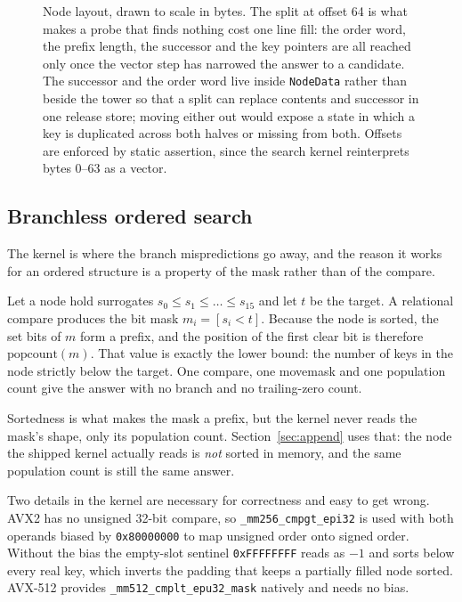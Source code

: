 \documentclass[conference]{IEEEtran}
\begin{document}
\begin{figure}[t]
{\begin{tikzpicture}
\end{tikzpicture}}
\caption{Node layout, drawn to scale in bytes. The split at offset 64 is what makes a
probe that finds nothing cost one line fill: the order word, the prefix length, the
successor and the key pointers are all reached only once the vector step has narrowed
the answer to a candidate. The successor and the order word live inside
\texttt{NodeData} rather than beside the tower so that a split can replace contents and
successor in one release store; moving either out would expose a state in which a key is
duplicated across both halves or missing from both. Offsets are enforced by static
assertion, since the search kernel reinterprets bytes 0--63 as a vector.}
\label{fig:layout}
\end{figure}

\subsection{Branchless ordered search}
\label{sec:kernel}

The kernel is where the branch mispredictions go away, and the reason it works for
an ordered structure is a property of the mask rather than of the compare.

Let a node hold surrogates $s_0 \le s_1 \le \dots \le s_{15}$ and let $t$ be the
target. A relational compare produces the bit mask $m_i = [s_i < t]$. Because the
node is sorted, the set bits of $m$ form a prefix, and the position of the first
clear bit is therefore $\mathrm{popcount}(m)$. That value is exactly the lower
bound: the number of keys in the node strictly below the target. One compare, one
movemask and one population count give the answer with no branch and no
trailing-zero count.

Sortedness is what makes the mask a prefix, but the kernel never reads the mask's
shape, only its population count. Section~\ref{sec:append} uses that: the node the
shipped kernel actually reads is \emph{not} sorted in memory, and the same
population count is still the same answer.

Two details in the kernel are necessary for correctness and easy to get wrong. AVX2 has no
unsigned 32-bit compare, so \texttt{\_mm256\_cmpgt\_epi32} is used with both
operands biased by \texttt{0x80000000} to map unsigned order onto signed order.
Without the bias the empty-slot sentinel \texttt{0xFFFFFFFF} reads as $-1$ and
sorts below every real key, which inverts the padding that keeps a partially
filled node sorted. AVX-512 provides \texttt{\_mm512\_cmplt\_epu32\_mask}
natively and needs no bias.
\end{document}
